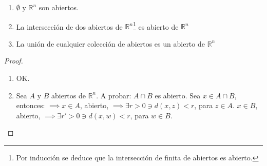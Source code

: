 \begin{theorem}
\begin{enumerate}
    \item $\emptyset$ y $\mathbb{R}^n$ son abiertos. 
    \item La intersección de dos abiertos de $\mathbb{R}^n$\footnote{Por inducción se deduce que la intersección de finita de abiertos es abierto.} es abierto de $\mathbb{R}^n$
    \item La unión de cualquier colección de abiertos es un abierto de $\mathbb{R}^n$
\end{enumerate}
\end{theorem}

\begin{proof}
\begin{enumerate}
    \item OK. 
    \item Sea $A$ y $B$ abiertos de $\mathbb{R}^n$. A probar: $A\cap B$ es abierto. Sea $x\in A\cap B$, entonces: \newline 
    $\implies x\in A$, abierto, $\implies \exists r>0\ni d(x,z)<r$, para $z\in A$. \newline 
    $x\in B$, abierto, $\implies \exists r'>0\ni d(x,w)<r$, para $w\in B$. 
    
    \begin{center}
        


\begin{tikzpicture}[x=0.75pt,y=0.75pt,yscale=-1,xscale=1]


\end{tikzpicture}
\end{center}
\end{enumerate}
\end{proof}

